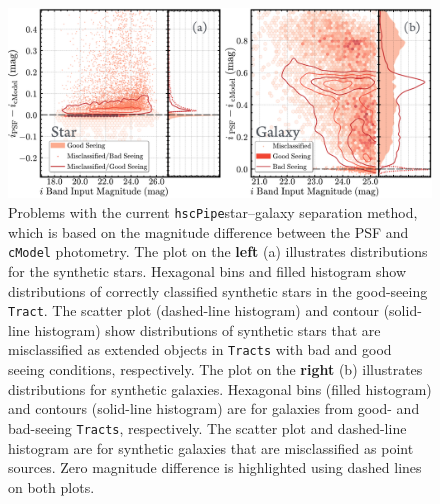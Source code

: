 \documentclass[useamsfonts]{pasj01}
\def\hscpipe{\texttt{hscPipe}}
\def\cmodel{\texttt{cModel}}
\def\tract{\texttt{Tract}}
\def\tracts{\texttt{Tracts}}
\begin{document}
\begin{figure}
    \begin{center}
        \includegraphics[width=\textwidth]{fig/synpipe_star_galaxy}
    \end{center}
    \caption{
        Problems with the current  \hscpipe{}star--galaxy separation method, which is based on the magnitude difference between the PSF and
        \cmodel{} photometry.
       The plot on the \textbf{left} (a) illustrates distributions for the synthetic stars.
        Hexagonal bins and filled histogram show distributions of correctly classified
        synthetic stars in the good-seeing \tract{}.
        The scatter plot (dashed-line histogram) and contour (solid-line histogram)
        show distributions of synthetic stars that are misclassified as extended
        objects in \tracts{} with bad and good seeing conditions, respectively.
        The plot on the \textbf{right} (b) illustrates distributions for synthetic galaxies.
        Hexagonal bins (filled histogram) and contours (solid-line histogram)
        are for galaxies from good- and bad-seeing \tracts{}, respectively.
        The scatter plot and dashed-line histogram are for synthetic galaxies that are
        misclassified as point sources.
        Zero magnitude difference is highlighted using dashed lines on both plots.
        }
    \label{fig:sg}
\end{figure}
\end{document}
